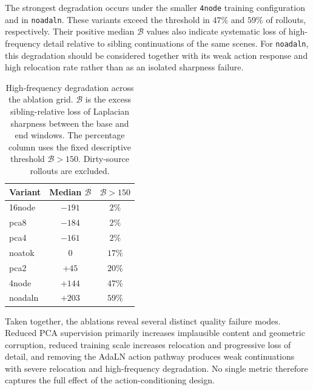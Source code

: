 \documentclass[letterpaper]{article} %
\begin{document}
The strongest degradation occurs under the smaller \texttt{4node} training
configuration and in \texttt{noadaln}. These variants exceed the threshold
in $47\%$ and $59\%$ of rollouts, respectively. Their positive median
$\mathcal B$ values also indicate systematic loss of high-frequency detail
relative to sibling continuations of the same scenes. For
\texttt{noadaln}, this degradation should be considered together with its
weak action response and high relocation rate rather than as an isolated
sharpness failure.

\begin{table}[t]
\centering
\small
\caption{
    High-frequency degradation across the ablation grid. $\mathcal B$ is the
    excess sibling-relative loss of Laplacian sharpness between the base and
    end windows. The percentage column uses the fixed descriptive threshold
    $\mathcal B>150$. Dirty-source rollouts are excluded.
}
\label{tab:hf_losses}
\begin{tabular}{lcc}
\toprule
Variant & Median $\mathcal B$ & $\mathcal B>150$ \\
\midrule
16node  & $-191$ & $2\%$  \\
pca8    & $-184$ & $2\%$  \\
pca4    & $-161$ & $2\%$  \\
noatok  & $0$    & $17\%$ \\
pca2    & $+45$  & $20\%$ \\
4node   & $+144$ & $47\%$ \\
noadaln & $+203$ & $59\%$ \\
\bottomrule
\end{tabular}
\end{table}

Taken together, the ablations reveal several distinct quality failure modes.
Reduced PCA supervision primarily increases implausible content and geometric
corruption, reduced training scale increases relocation and progressive loss
of detail, and removing the AdaLN action pathway produces weak continuations
with severe relocation and high-frequency degradation. No single metric
therefore captures the full effect of the action-conditioning design.
\end{document}
